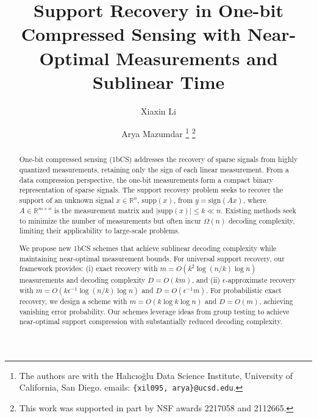 \documentclass{article}
\title{Support Recovery in One-bit Compressed Sensing with Near-Optimal Measurements and Sublinear Time}
\author{Xiaxin Li \and Arya Mazumdar
\thanks{The authors are with the Hal{\i}c{\i}o\u{g}lu Data Science Institute, University of California, San Diego. emails: \texttt{\{xil095, arya\}@ucsd.edu}.
}
\thanks{This work was supported in part by NSF awards 2217058 and 2112665.}
}
\date{}
\newcommand{\supp}{\mathrm{supp}}
\newcommand{\sgn}{\mathrm{sign}}
\begin{document}
\maketitle

\begin{abstract}
One-bit compressed sensing (1bCS) addresses the recovery of sparse signals from highly quantized measurements, retaining only the sign of each linear measurement. From a data compression perspective, the one-bit measurements form a compact binary representation of sparse signals. The support recovery problem seeks to recover the support of an unknown signal $x\in\mathbb{R}^n$, $\supp(x)$, from $y=\sgn(Ax)$, where $A\in\mathbb{R}^{m\times n}$ is the measurement matrix and $|\supp(x)|\le k\ll n$. Existing methods seek to minimize the number of measurements but often incur $\Omega(n)$ decoding complexity, limiting their applicability to large-scale problems.

We propose new 1bCS schemes that achieve sublinear decoding complexity while maintaining near-optimal measurement bounds. For universal support recovery, our framework provides: (i) exact recovery with $m=O(k^2\log(n/k)\log n)$ measurements and decoding complexity $D=O(km)$, and (ii) $\epsilon$-approximate recovery with $m=O(k\epsilon^{-1}\log(n/k)\log n)$ and $D=O(\epsilon^{-1}m)$. For probabilistic exact recovery, we design a scheme with $m=O(k\log k\log n)$ and $D=O(m)$, achieving vanishing error probability. Our schemes leverage ideas from group testing to achieve near-optimal support compression with substantially reduced decoding complexity.




\end{abstract}
\end{document}
